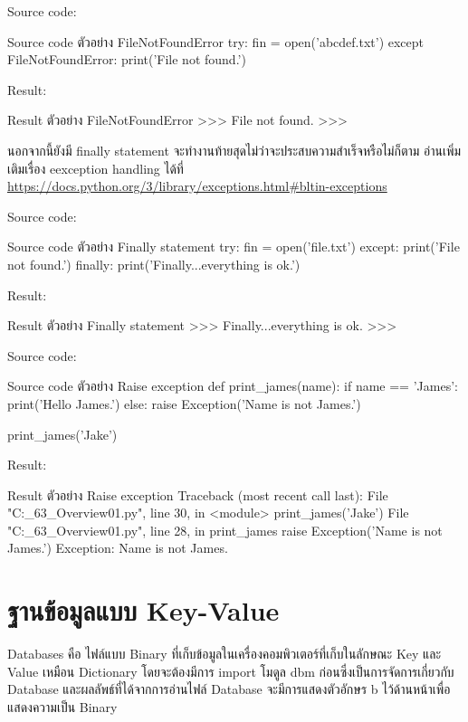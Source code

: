 Source code:
\begin{codelist}{Source code ตัวอย่าง FileNotFoundError}{}
try:
    fin = open('abcdef.txt')
except FileNotFoundError:
    print('File not found.')
\end{codelist}

Result:
\begin{codelist}{Result ตัวอย่าง FileNotFoundError}{}
>>>
File not found.
>>>
\end{codelist}

นอกจากนี้ยังมี finally statement จะทำงานท้ายสุดไม่ว่าจะประสบความสำเร็จหรือไม่ก็ตาม อ่านเพิ่มเติมเรื่อง eexception handling ได้ที่ \url{https://docs.python.org/3/library/exceptions.html\#bltin-exceptions}

Source code:
\begin{codelist}{Source code ตัวอย่าง Finally statement}{}
try:
    fin = open('file.txt')
except:
    print('File not found.')
finally:
    print('Finally...everything is ok.')
\end{codelist}

Result:
\begin{codelist}{Result ตัวอย่าง Finally statement}{}
>>>
Finally...everything is ok.
>>>
\end{codelist}

Source code:
\begin{codelist}{Source code ตัวอย่าง Raise exception}{}
def print_james(name):
    if name == 'James':
        print('Hello James.')
    else:
        raise Exception('Name is not James.')

print_james('Jake')
\end{codelist}

Result:
\begin{codelist}{Result ตัวอย่าง Raise exception}{}
Traceback (most recent call last):
  File "C:\Users\janta\OneDrive\Documents{}_63_Overview\code01.py", line 30, in <module>
    print_james('Jake')
  File "C:\Users\janta\OneDrive\Documents{}_63_Overview\code01.py", line 28, in print_james
    raise Exception('Name is not James.')
Exception: Name is not James.
\end{codelist}



\section{ฐานข้อมูลแบบ Key-Value}

Databases คือ ไฟล์แบบ Binary ที่เก็บข้อมูลในเครื่องคอมพิวเตอร์ที่เก็บในลักษณะ Key และ Value เหมือน Dictionary โดยจะต้องมีการ import โมดูล dbm ก่อนซึ่งเป็นการจัดการเกี่ยวกับ Database และผลลัพธ์ที่ได้จากการอ่านไฟล์ Database จะมีการแสดงตัวอักษร b ไว้ด้านหน้าเพื่อแสดงความเป็น Binary

